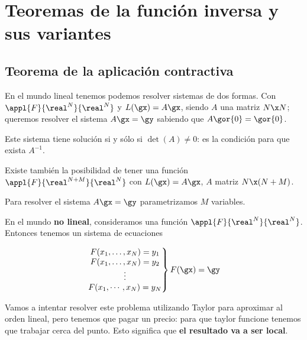 \chapter{Teoremas de la función inversa y sus variantes}

\section{Teorema de la aplicación contractiva}

En el mundo lineal tenemos podemos resolver sistemas de dos formas. Con $\appl{F}{\real^N}{\real^N}$ y $L(\gx) = A\gx$, siendo $A$ una matriz $N\x N$; queremos resolver el sistema $A\gx = \gy$ sabiendo que $A\gor{0} = \gor{0}$.

Este sistema tiene solución si y sólo si  $\det(A) \neq 0$: es la condición para que exista $A^{-1}$.

Existe también la posibilidad de tener una función $\appl{F}{\real^{N+M}}{\real^N}$ con $L(\gx) = A\gx$, $A$ matriz $N\x (N+M)$.

Para resolver el sistema $A\gx = \gy$ parametrizamos $M$ variables.

En el mundo \textbf{no lineal}, consideramos una función $\appl{F}{\real^N}{\real^N}$. Entonces tenemos un sistema de ecuaciones

\[ \left.\begin{matrix}
F(x_1,\dotsc,x_N) = y_1\\
F(x_1,\dotsc,x_N) = y_2\\
\vdots\\
F(x_1,\cdots,x_N) = y_N
        \end{matrix}
\right\} F(\gx)=\gy \]

Vamos a intentar resolver este problema utilizando Taylor para aproximar al orden lineal, pero tenemos que pagar un precio: para que taylor funcione tenemos que trabajar cerca del punto. Esto significa que \textbf{el resultado va a ser local}.


